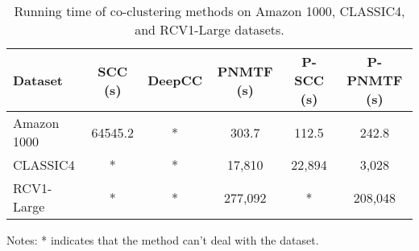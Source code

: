 
\begin{table*}[htbp]
    \centering
    \caption{Running time of co-clustering methods on Amazon 1000, CLASSIC4, and RCV1-Large datasets.}
    \label{tab:running-time}
    \begin{tabular}{@{} l ccccc @{}}
        \toprule
        Dataset     & SCC (s) & DeepCC & PNMTF (s) & P-SCC (s) & P-PNMTF (s) \\
        \midrule
        Amazon 1000 & 64545.2 & *      & 303.7     & 112.5     & 242.8       \\
        CLASSIC4    & *       & *      & 17,810    & 22,894    & 3,028       \\
        RCV1-Large  & *       & *      & 277,092   & *         & 208,048     \\
        \bottomrule
    \end{tabular}
    \begin{tablenotes}
        \small
        \item Notes: * indicates that the method can't deal with the dataset.
    \end{tablenotes}
\end{table*}

